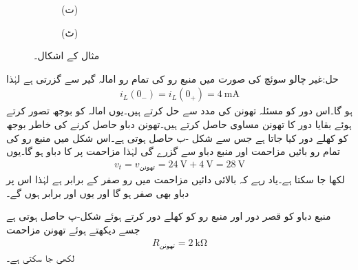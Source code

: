 \begin{figure}
\begin{subfigure}{0.5\textwidth}
\begin{tikzpicture}
\end{tikzpicture}%
\caption*{(ت)}
\end{subfigure}%
\begin{subfigure}{0.5\textwidth}
\centering
\pgfplotsset{scaled y ticks=false, scaled x ticks=false}
%
\caption*{(ٹ)}
\end{subfigure}%
\caption{مثال  کے اشکال۔}
\label{شکل_عارضی_دو_عدد_مزاحمت_امالہ_گیر_الف}
\end{figure}

حل:غیر چالو سوئچ کی صورت میں منبع رو کی تمام رو امالہ گیر سے گزرتی ہے لہٰذا
\begin{align*}
i_L(0_-)=i_L(0_+)=\SI{4}{\milli\ampere}
\end{align*}
ہو گا۔اس دور کو مسئلہ تھونن کی مدد سے حل کرتے ہیں۔یوں امالہ کو بوجھ تصور کرتے ہوئے بقایا دور کا تھونن مساوی حاصل کرتے ہیں۔تھونن دباو حاصل کرنے کی خاطر بوجھ کو کھلے دور کیا جاتا ہے جس سے شکل -ب حاصل ہوتی ہے۔اس شکل میں منبع رو کی تمام رو بائیں مزاحمت اور منبع دباو سے گزرے گی لہٰذا مزاحمت پر  کا دباو ہو گا۔یوں
\begin{align*}
v_t=v_{\text{تھونن}}=\SI{24}{\volt}+\SI{4}{\volt}=\SI{28}{\volt}
\end{align*}
لکھا جا سکتا ہے۔یاد رہے کہ بالائی دائیں مزاحمت میں رو صفر کے برابر ہے لہٰذا اس پر دباو بھی صفر ہو گا اور یوں  اور  برابر ہوں گے۔

منبع دباو کو قصر دور اور منبع رو کو کھلے دور کرتے ہوئے شکل-پ حاصل ہوتی ہے جسے دیکھتے ہوئے تھونن مزاحمت
\begin{align*}
R_{\text{تھونن}}=\SI{2}{\kilo\ohm}
\end{align*}
لکھی جا سکتی ہے۔

